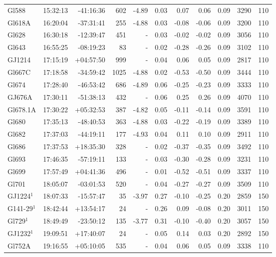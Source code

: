 \documentclass{aa}
\begin{document}
{\begin{longtable}{l r r r r r r r r r r}
Gl588 & 15:32:13 & -41:16:36 & 602 & -4.89 & 0.03 & 0.07 & 0.06 & 0.09 & 3290 &  110 \\
Gl618A & 16:20:04 & -37:31:41 & 255 & -4.88 & 0.03 & -0.08 & -0.06 & 0.09 & 3200 &  110 \\
Gl628 & 16:30:18 & -12:39:47 & 451 &    - & 0.03 & -0.02 & -0.02 & 0.09 & 3056 &  110 \\
Gl643 & 16:55:25 & -08:19:23 & 83 &    - & 0.02 & -0.28 & -0.26 & 0.09 & 3102 &  110 \\
GJ1214 & 17:15:19 & +04:57:50 & 999 &    - & 0.04 & 0.06 & 0.05 & 0.09 & 2817 &  110 \\
Gl667C & 17:18:58 & -34:59:42 & 1025 & -4.88 & 0.02 & -0.53 & -0.50 & 0.09 & 3444 &  110 \\
Gl674 & 17:28:40 & -46:53:42 & 686 & -4.89 & 0.06 & -0.25 & -0.23 & 0.09 & 3333 &  110 \\
GJ676A & 17:30:11 & -51:38:13 & 432 &    - & 0.06 & 0.25 & 0.26 & 0.09 & 4070 &  110 \\
Gl678.1A & 17:30:22 & +05:32:53 & 387 & -4.82 & 0.05 & -0.11 & -0.14 & 0.09 & 3591 &  110 \\
Gl680 & 17:35:13 & -48:40:53 & 363 & -4.88 & 0.03 & -0.22 & -0.19 & 0.09 & 3389 &  110 \\
Gl682 & 17:37:03 & -44:19:11 & 177 & -4.93 & 0.04 & 0.11 & 0.10 & 0.09 & 2911 &  110 \\
Gl686 & 17:37:53 & +18:35:30 & 328 &    - & 0.02 & -0.37 & -0.35 & 0.09 & 3492 &  110 \\
Gl693 & 17:46:35 & -57:19:11 & 133 &    - & 0.03 & -0.30 & -0.28 & 0.09 & 3231 &  110 \\
Gl699 & 17:57:49 & +04:41:36 & 496 &    - & 0.01 & -0.52 & -0.51 & 0.09 & 3337 &  110 \\
Gl701 & 18:05:07 & -03:01:53 & 520 &    - & 0.04 & -0.27 & -0.27 & 0.09 & 3509 &  110 \\
GJ1224$^1$ & 18:07:33 & -15:57:47 & 35 & -3.97 & 0.27 & -0.10 & -0.25 & 0.20 & 2859 &  150 \\
G141-29$^1$ & 18:42:44 & +13:54:17 & 24 &    - & 0.26 & 0.09 & -0.08 & 0.20 & 3011 &  150 \\
Gl729$^1$ & 18:49:49 & -23:50:12 & 135 & -3.77 & 0.31 & -0.10 & -0.40 & 0.20 & 3057 &  150 \\
GJ1232$^1$ & 19:09:51 & +17:40:07 & 24 &    - & 0.05 & 0.14 & 0.03 & 0.20 & 2892 &  150 \\
Gl752A & 19:16:55 & +05:10:05 & 535 &    - & 0.04 & 0.06 & 0.05 & 0.09 & 3338 &  110 \\

\end{longtable}}
\end{document}
